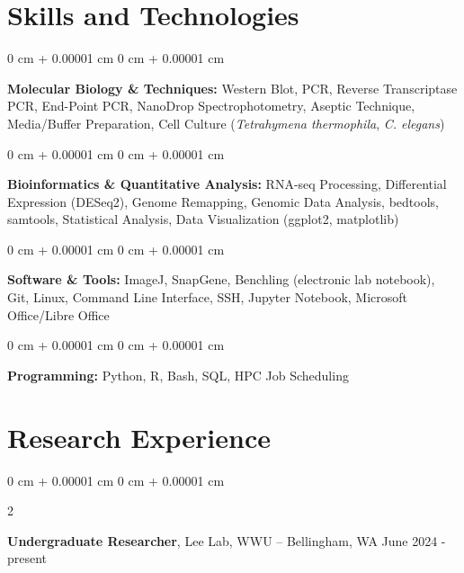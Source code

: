 \documentclass[10pt, article]{article}
\newenvironment{onecolentry}{
    \begin{adjustwidth}{
        0 cm + 0.00001 cm
    }{
        0 cm + 0.00001 cm
    }
}{
    \end{adjustwidth}
} %
\newenvironment{twocolentry}[2][]{
    \onecolentry
    \def\secondColumn{#2}
    \setcolumnwidth{\fill, 4.5 cm}
    \begin{paracol}{2}
}{
    \switchcolumn \raggedleft \secondColumn
    \end{paracol}
    \endonecolentry
} %
\begin{document}
%



\section{Skills and Technologies}

\begin{onecolentry}
	\textbf{Molecular Biology \& Techniques:} Western Blot, PCR, Reverse Transcriptase PCR, End-Point PCR, NanoDrop Spectrophotometry, Aseptic Technique, Media/Buffer Preparation, Cell Culture (\textit{Tetrahymena thermophila}, \textit{C. elegans})
\end{onecolentry}
\vspace{0.2 cm}
\begin{onecolentry}
	\textbf{Bioinformatics \& Quantitative Analysis:} RNA-seq Processing, Differential Expression (DESeq2), Genome Remapping, Genomic Data Analysis, bedtools, samtools, Statistical Analysis, Data Visualization (ggplot2, matplotlib)
\end{onecolentry}
\vspace{0.2 cm}
\begin{onecolentry}
	\textbf{Software \& Tools:} ImageJ, SnapGene, Benchling (electronic lab notebook), Git, Linux, Command Line Interface, SSH, Jupyter Notebook, Microsoft Office/Libre Office
\end{onecolentry}
\vspace{0.2 cm}
\begin{onecolentry}
	\textbf{Programming:} Python, R, Bash, SQL, HPC Job Scheduling
\end{onecolentry}

\section{Research Experience}




\begin{twocolentry}{
		June 2024 - present
	}
	\textbf{Undergraduate Researcher}, Lee Lab, WWU -- Bellingham, WA\end{twocolentry}
\end{document}
